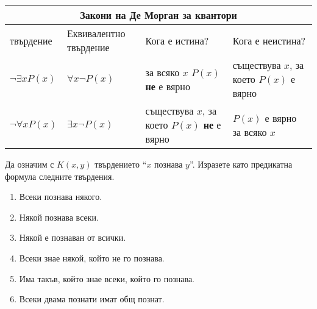 \bigskip
\begin{tabular}{|l|p{2.5cm}|p{3.2cm}|p{3cm}|}
  \hline
  \multicolumn{4}{|c|}{{\bf Закони на Де Морган за квантори}}\\
  \hline
  твърдение & Еквивалентно твърдение & Кога е истина? & Кога е неистина?\\
  \hline
  $\neg \exists x P(x)$ & $\forall x \neg P(x)$ & за всяко $x$ $P(x)$ {\bf не} е вярно & съществува $x$, за което $P(x)$ е вярно \\
  \hline
  $\neg \forall x P(x)$ & $\exists x \neg P(x)$ & съществува $x$, за което $P(x)$ {\bf не} е вярно & $P(x)$ е вярно за всяко $x$\\
  \hline
\end{tabular}  
\bigskip

\begin{problem}
  Да означим с $K(x,y)$ твърдението ``$x$ познава $y$''.
  Изразете като предикатна формула следните твърдения.
  \begin{enumerate}[1)]
  \item
    Всеки познава някого.
  \item
    Някой познава всеки.
  \item
    Някой е познаван от всички.
  \item
    Всеки знае някой, който не го познава.
  \item
    Има такъв, който знае всеки, който го познава.
  \item
    Всеки двама познати имат общ познат.
  \end{enumerate}
\end{problem}

